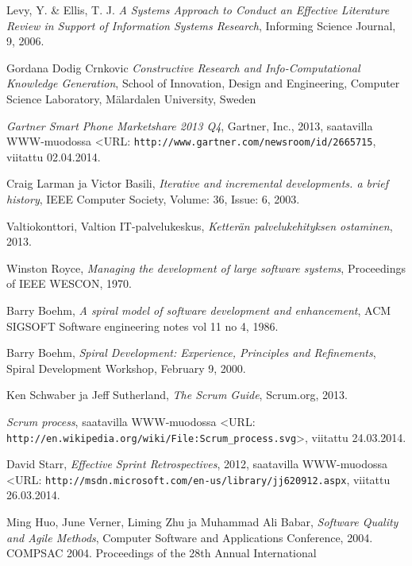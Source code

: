 \documentclass[finnish,nonumbib,nocopyright]{gradu2}
\begin{document}
\begin{thebibliography}{9} %

Levy, Y. \& Ellis, T. J. \textit{A Systems Approach to Conduct an Effective Literature Review in Support of Information Systems Research},
Informing Science Journal, 9, 2006.

Gordana Dodig Crnkovic \textit{Constructive Research and Info-Computational Knowledge Generation},
School of Innovation, Design and Engineering, Computer Science Laboratory, Mälardalen University, Sweden

\textit{Gartner Smart Phone Marketshare 2013 Q4}, Gartner, Inc., 2013, saatavilla WWW-muodossa
<URL: \texttt{http://www.gartner.com/newsroom/id/2665715}, viitattu 02.04.2014.

Craig Larman ja Victor Basili, \textit{Iterative and incremental developments. a brief history},
IEEE Computer Society, Volume: 36, Issue: 6, 2003.

Valtiokonttori, Valtion IT-palvelukeskus, \textit{Ketterän palvelukehityksen ostaminen}, 2013. 

Winston Royce, \textit{Managing the development of large software systems},
Proceedings of IEEE WESCON, 1970.

Barry Boehm, \textit{A spiral model of software development and enhancement},
ACM SIGSOFT Software engineering notes vol 11 no 4, 1986.

Barry Boehm, \textit{Spiral Development: Experience, Principles and Refinements},
Spiral Development Workshop, February 9, 2000.

Ken Schwaber ja Jeff Sutherland, \textit{The Scrum Guide}, Scrum.org, 2013.

\textit{Scrum process}, saatavilla WWW-muodossa
<URL: \texttt{http://en.wikipedia.org/wiki/File:Scrum\_process.svg}>, viitattu 24.03.2014.

David Starr, \textit{Effective Sprint Retrospectives}, 2012, saatavilla WWW-muodossa
<URL: \texttt{http://msdn.microsoft.com/en-us/library/jj620912.aspx}, viitattu 26.03.2014.

Ming Huo, June Verner, Liming Zhu ja Muhammad Ali Babar, \textit{Software Quality and Agile Methods}, 
Computer Software and Applications Conference, 2004. COMPSAC 2004. Proceedings of the 28th Annual International


\end{thebibliography}
\end{document}

